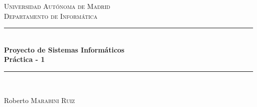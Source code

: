 \documentclass[12pt]{article} %
\begin{document}

\begin{titlepage}

\newcommand{\HRule}{\rule{\linewidth}{0.5mm}} %

\center %

\textsc{\LARGE Universidad Aut\'{o}noma de Madrid}\\[1.5cm] %
\textsc{\Large Departamento de Inform\'{a}tica}\\[0.5cm] %

\HRule \\[0.4cm]
{ \huge \bfseries Proyecto de Sistemas Inform\'{a}ticos\\[0.5cm] Pr\'{a}ctica - 1}\\[0.4cm] %
\HRule \\[1.5cm]





\vfill %
\begin{flushright}
 \large
Roberto  \textsc{Marabini Ruiz} %
\end{flushright}

\end{titlepage}
\end{document}
